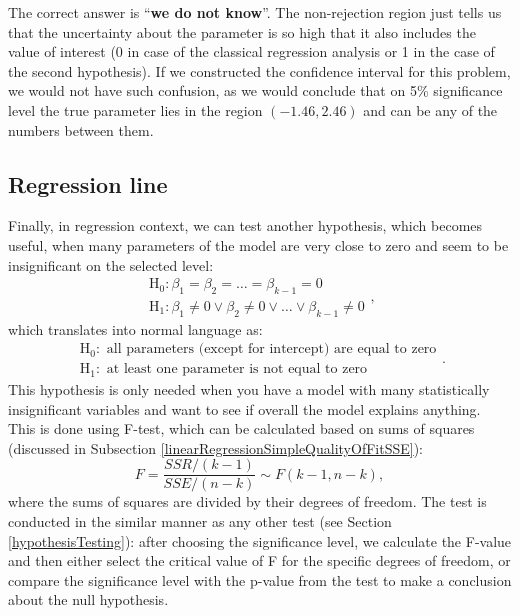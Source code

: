 \documentclass[
]{book}
\theoremstyle{definition}
\theoremstyle{definition}
\theoremstyle{definition}
\theoremstyle{definition}
\theoremstyle{remark}
\begin{document}
The correct answer is ``\textbf{we do not know}''. The non-rejection region just tells us that the uncertainty about the parameter is so high that it also includes the value of interest (0 in case of the classical regression analysis or 1 in the case of the second hypothesis). If we constructed the confidence interval for this problem, we would not have such confusion, as we would conclude that on 5\% significance level the true parameter lies in the region \((-1.46, 2.46)\) and can be any of the numbers between them.

\subsection{Regression line}\label{regression-line}

Finally, in regression context, we can test another hypothesis, which becomes useful, when many parameters of the model are very close to zero and seem to be insignificant on the selected level:
\begin{equation}
    \begin{aligned}
        \mathrm{H}_0: \beta_1 = \beta_2 = \dots = \beta_{k-1} = 0 \\
        \mathrm{H}_1: \beta_1 \neq 0 \vee \beta_2 \neq 0 \vee \dots \vee \beta_{k-1} \neq 0
    \end{aligned} ,
\label{eq:regressionHypothesis02}
\end{equation}
which translates into normal language as:
\begin{equation*}
    \begin{aligned}
        \mathrm{H}_0: \text{ all parameters (except for intercept) are equal to zero}\\
        \mathrm{H}_1: \text{ at least one parameter is not equal to zero}
    \end{aligned} .
\end{equation*}
This hypothesis is only needed when you have a model with many statistically insignificant variables and want to see if overall the model explains anything. This is done using F-test, which can be calculated based on sums of squares (discussed in Subsection \ref{linearRegressionSimpleQualityOfFitSSE}):
\begin{equation*}
F = \frac{ SSR / (k-1)}{SSE / (n-k)} \sim F(k-1, n-k) ,
\end{equation*}
where the sums of squares are divided by their degrees of freedom. The test is conducted in the similar manner as any other test (see Section \ref{hypothesisTesting}): after choosing the significance level, we calculate the F-value and then either select the critical value of F for the specific degrees of freedom, or compare the significance level with the p-value from the test to make a conclusion about the null hypothesis.
\end{document}
